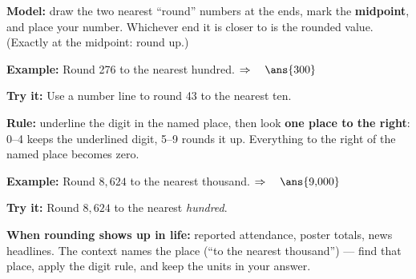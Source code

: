 \documentclass[12pt]{article}
\begin{document}


\begin{formulabox}
\textbf{Model:} draw the two nearest ``round'' numbers at the ends, mark the
\textbf{midpoint}, and place your number. Whichever end it is closer to is the
rounded value. (Exactly at the midpoint: round up.)
\end{formulabox}

\begin{examplebox}
\textbf{Example:} \quad Round 276 to the nearest hundred.
$\Rightarrow\quad \ans{300}$
\end{examplebox}

\begin{tryitbox}
\textbf{Try it:} \quad Use a number line to round 43 to the nearest ten.\\[2pt]
\end{tryitbox}


\begin{formulabox}
\textbf{Rule:} underline the digit in the named place, then look \textbf{one
place to the right}: 0--4 keeps the underlined digit, 5--9 rounds it up.
Everything to the right of the named place becomes zero.
\end{formulabox}

\begin{examplebox}
\textbf{Example:} \quad Round $8{,}624$ to the nearest thousand.
$\Rightarrow\quad \ans{9{,}000}$
\end{examplebox}

\begin{tryitbox}
\textbf{Try it:} \quad Round $8{,}624$ to the nearest \emph{hundred}.\\[2pt]
\end{tryitbox}


\begin{formulabox}
\textbf{When rounding shows up in life:} reported attendance, poster totals,
news headlines. The context names the place (``to the nearest thousand'') ---
find that place, apply the digit rule, and keep the units in your answer.
\end{formulabox}
\end{document}
